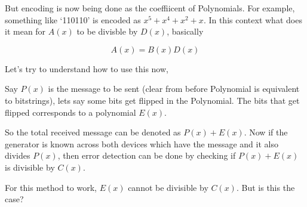 \documentclass[12pt]{article}
\begin{document}
But encoding is now being done as the coeffiicent of Polynomials. 
For example, something like `110110' is encoded as \(x^5 + x^4 + x^2 + x\). 
In this context what does it mean for \(A(x)\) to be divisble by \(D(x)\), basically

\[A(x) = B(x)D(x)\]

Let's try to understand how to use this now, 

Say \(P(x)\) is the message to be sent (clear from before Polynomial is equivalent to bitstrings), lets say some bits get 
flipped in the Polynomial. The bits that get flipped corresponds to a polynomial \(E(x)\). 


So the total received message can be denoted as \(P(x) + E(x)\). 
Now if the generator is known across both devices which have the message and it also divides \(P(x)\), then 
error detection can be done by checking if \(P(x) + E(x)\) is divisible by \(C(x)\). 

For this method to work, \(E(x)\) cannot be divisible by \(C(x)\). But is this the case?
\end{document}
